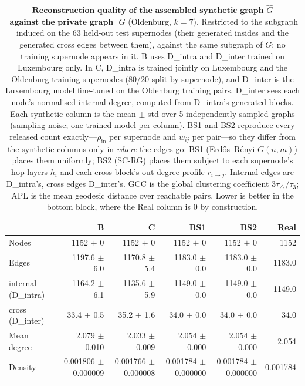 \begin{table}[H]
\centering
\caption{$\textbf{Reconstruction quality of the assembled synthetic graph}$
$\widehat{G}$ $\textbf{ against the private graph }$ $G$ (Oldenburg, $k{=}7$). Restricted to the subgraph induced on the 63 held-out test supernodes (their generated insides and the generated cross edges between them), against the same subgraph of $G$; no training supernode appears in it.
B uses D\_intra and D\_inter trained on Luxembourg only. In C, D\_intra is trained jointly on Luxembourg and the Oldenburg training supernodes (80/20 split by supernode), and D\_inter is the Luxembourg model fine-tuned on the Oldenburg training pairs. D\_inter sees each node's normalised internal degree, computed from D\_intra's generated blocks. Each synthetic column is the
mean $\pm$ std over 5 independently sampled graphs (sampling noise; one trained
model per column). BS1 and BS2 reproduce every released count exactly---$\rho_{\mathrm{in}}$
per supernode and $w_{ij}$ per pair---so they differ from the synthetic columns
only in \emph{where} the edges go: BS1 (Erd\H{o}s--R\'enyi $G(n,m)$) places them
uniformly; BS2 (SC-RG) places them subject to each supernode's hop layers $h_i$ and
each cross block's out-degree profile $r_{i\to j}$. Internal edges are D\_intra's, cross edges
D\_inter's. GCC is the global clustering coefficient $3\tau_{\triangle}/\tau_{3}$;
APL is the mean geodesic distance over reachable pairs. Lower is better in the
bottom block, where the Real column is $0$ by construction.}
\label{tab:lsyn-oldenburg-k7-test}
\begin{tabular}{lrrrrr}
\toprule
 & B & C & BS1 & BS2 & Real \\
\midrule
Nodes                         & 1152 $\pm$ 0 & 1152 $\pm$ 0 & 1152 $\pm$ 0 & 1152 $\pm$ 0 & 1152 \\
Edges                         & 1197.6 $\pm$ 6.0 & 1170.8 $\pm$ 5.4 & 1183.0 $\pm$ 0.0 & 1183.0 $\pm$ 0.0 & 1183.0 \\
\quad internal (D\_intra)     & 1164.2 $\pm$ 6.1 & 1135.6 $\pm$ 5.9 & 1149.0 $\pm$ 0.0 & 1149.0 $\pm$ 0.0 & 1149.0 \\
\quad cross (D\_inter)        & 33.4 $\pm$ 0.5 & 35.2 $\pm$ 1.6 & 34.0 $\pm$ 0.0 & 34.0 $\pm$ 0.0 & 34.0 \\
Mean degree                   & 2.079 $\pm$ 0.010 & 2.033 $\pm$ 0.009 & 2.054 $\pm$ 0.000 & 2.054 $\pm$ 0.000 & 2.054 \\
Density                       & 0.001806 $\pm$ 0.000009 & 0.001766 $\pm$ 0.000008 & 0.001784 $\pm$ 0.000000 & 0.001784 $\pm$ 0.000000 & 0.001784 \\

\end{tabular}
\end{table}
